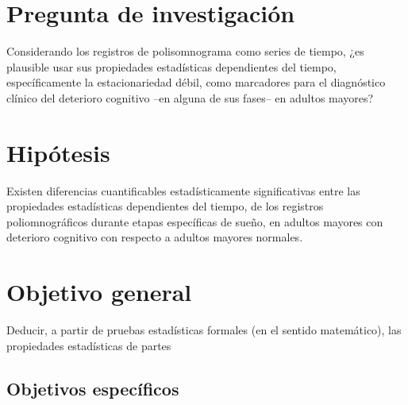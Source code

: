 
\section{Pregunta de investigaci\'on}

Considerando los registros de polisomnograma como series de tiempo,
¿es plausible usar sus propiedades estad\'isticas dependientes del tiempo, espec\'ificamente
la estacionariedad d\'ebil,
como marcadores para el diagn\'ostico cl\'inico del deterioro cognitivo --en alguna de 
sus fases-- en adultos mayores?


\section{Hip\'otesis}

Existen diferencias cuantificables estad\'isticamente significativas entre las propiedades
estad\'isticas dependientes del tiempo, de los registros poliomnogr\'aficos
durante etapas espec\'ificas de sue\~no, en adultos
mayores con deterioro cognitivo con respecto a adultos mayores normales.


\section{Objetivo general}

Deducir, a partir de pruebas estad\'isticas formales (en el sentido matem\'atico), las propiedades
estad\'isticas de partes 

\subsection{Objetivos espec\'ificos}

